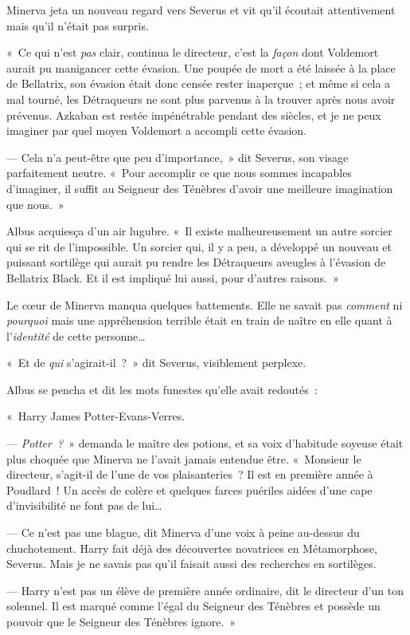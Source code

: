 Minerva jeta un nouveau regard vers Severus et vit qu'il écoutait attentivement mais qu'il n'était pas surpris.

«~Ce qui n'est \emph{pas} clair, continua le directeur, c'est la \emph{façon} dont Voldemort aurait pu manigancer cette évasion. Une poupée de mort a été laissée à la place de Bellatrix, son évasion était donc censée rester inaperçue~; et même si cela a mal tourné, les Détraqueurs ne sont plus parvenus à la trouver après nous avoir prévenus. Azkaban est restée impénétrable pendant des siècles, et je ne peux imaginer par quel moyen Voldemort a accompli cette évasion.

--- Cela n'a peut-être que peu d'importance,~» dit Severus, son visage parfaitement neutre. «~Pour accomplir ce que nous sommes incapables d'imaginer, il suffit au Seigneur des Ténèbres d'avoir une meilleure imagination que nous.~»

Albus acquiesça d'un air lugubre. «~Il existe malheureusement un autre sorcier qui se rit de l'impossible. Un sorcier qui, il y a peu, a développé un nouveau et puissant sortilège qui aurait pu rendre les Détraqueurs aveugles à l'évasion de Bellatrix Black. Et il est impliqué lui aussi, pour d'autres raisons.~»

Le cœur de Minerva manqua quelques battements. Elle ne savait pas \emph{comment} ni \emph{pourquoi} mais une appréhension terrible était en train de naître en elle quant à l'\emph{identité} de cette personne…

«~Et de \emph{qui} s'agirait-il~?~» dit Severus, visiblement perplexe.

Albus se pencha et dit les mots funestes qu'elle avait redoutés~:

«~Harry James Potter-Evans-Verres.

--- \emph{Potter~?}~» demanda le maître des potions, et sa voix d'habitude soyeuse était plus choquée que Minerva ne l'avait jamais entendue être. «~Monsieur le directeur, s'agit-il de l'une de vos plaisanteries~? Il est en première année à Poudlard~! Un accès de colère et quelques farces puériles aidées d'une cape d'invisibilité ne font pas de lui…

--- Ce n'est pas une blague, dit Minerva d'une voix à peine au-dessus du chuchotement. Harry fait déjà des découvertes novatrices en Métamorphose, Severus. Mais je ne savais pas qu'il faisait aussi des recherches en sortilèges.

--- Harry n'est pas un élève de première année ordinaire, dit le directeur d'un ton solennel. Il est marqué comme l'égal du Seigneur des Ténèbres et possède un pouvoir que le Seigneur des Ténèbres ignore.~»

